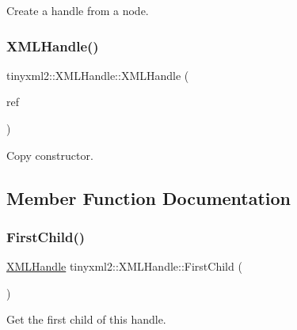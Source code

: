 Create a handle from a node. 

\mbox{\label{classtinyxml2_1_1_x_m_l_handle_afd8e01e6018c07347b8e6d80272466aa}} 
\subsubsection{\texorpdfstring{X\+M\+L\+Handle()}{XMLHandle()}\hspace{0.1cm}{\footnotesize\ttfamily [3/3]}}
{\footnotesize\ttfamily tinyxml2\+::\+X\+M\+L\+Handle\+::\+X\+M\+L\+Handle (\begin{DoxyParamCaption}\item[{const \hyperlink{classtinyxml2_1_1_x_m_l_handle}{X\+M\+L\+Handle} \&}]{ref }\end{DoxyParamCaption})\hspace{0.3cm}{\ttfamily [inline]}}



Copy constructor. 



\subsection{Member Function Documentation}
\mbox{\label{classtinyxml2_1_1_x_m_l_handle_a536447dc7f54c0cd11e031dad94795ae}} 
\subsubsection{\texorpdfstring{First\+Child()}{FirstChild()}}
{\footnotesize\ttfamily \hyperlink{classtinyxml2_1_1_x_m_l_handle}{X\+M\+L\+Handle} tinyxml2\+::\+X\+M\+L\+Handle\+::\+First\+Child (\begin{DoxyParamCaption}{ }\end{DoxyParamCaption})\hspace{0.3cm}{\ttfamily [inline]}}



Get the first child of this handle. 

